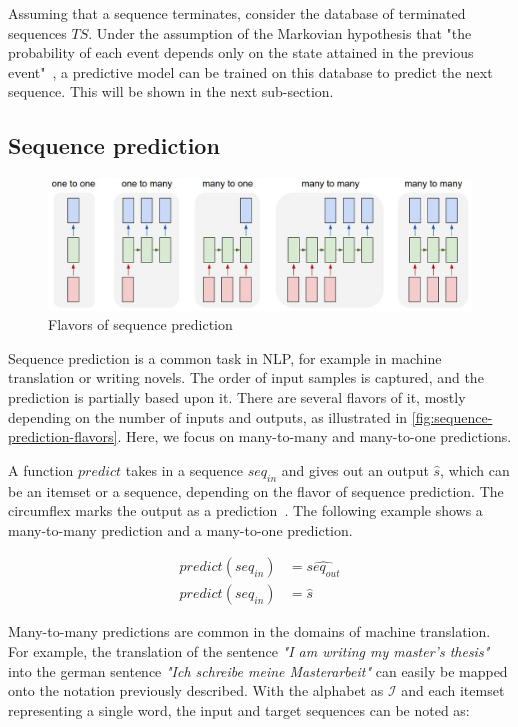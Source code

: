 Assuming that a sequence terminates, consider the database of terminated sequences $TS$. Under the assumption of the Markovian hypothesis that "the probability of each event depends only on the state attained in the previous event"~\cite{gagniuc2017markov}, a predictive model can be trained on this database to predict the next sequence. This will be shown in the next sub-section.

\subsection{Sequence prediction}\label{sec:background:sequence-prediction}
\begin{figure}[!htb]
    \centering
    \includegraphics[width=.75\textwidth]{gfx/sequence-prediction-flavors.jpeg}
    \caption{Flavors of sequence prediction~\cite{web:lstm-effectiveness}}
    \label{fig:sequence-prediction-flavors}
\end{figure}

Sequence prediction is a common task in NLP, for example in machine translation or writing novels. The order of input samples is captured, and the prediction is partially based upon it. There are several flavors of it, mostly depending on the number of inputs and outputs, as illustrated in \autoref{fig:sequence-prediction-flavors}. Here, we focus on many-to-many and many-to-one predictions.

A function $predict$ takes in a sequence $seq_{in}$ and gives out an output $\hat{s}$, which can be an itemset or a sequence, depending on the flavor of sequence prediction. The circumflex marks the output as a prediction~\cite{kuhn2013applied}. The following example shows a many-to-many prediction and a many-to-one prediction.

\begin{equation}
\begin{split}
    predict(seq_{in}) &= \widehat{seq_{out}}\\
    predict(seq_{in}) &= \hat{s}
\end{split}
\label{eq:prediction-from-sequence}
\end{equation}

Many-to-many predictions are common in the domains of machine translation. For example, the translation of the sentence \textit{"I am writing my master's thesis"} into the german sentence \textit{"Ich schreibe meine Masterarbeit"} can easily be mapped onto the notation previously described. With the alphabet as $\mathscr{I}$ and each itemset representing a single word, the input and target sequences can be noted as:

